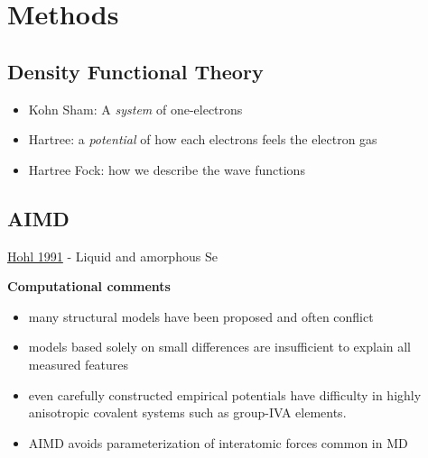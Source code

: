 \documentclass[3p,review,12pt]{elsarticle}
\newcommand{\vs}{\vspace{2mm}}
\begin{document}
\section{Methods}
\subsection{Density Functional Theory}
\begin{itemize}
	\item Kohn Sham: A \emph{system} of one-electrons
	\item Hartree: a \emph{potential} of how each electrons feels the electron gas
	\item Hartree Fock: how we describe the wave functions
\end{itemize}
\subsection{AIMD}
\underline{Hohl 1991}\cite{Hohl1991} - Liquid and amorphous Se \par \vs
\textbf{Computational comments}
\begin{itemize}
	\item many structural models have been proposed and often conflict
	\item models based solely on small differences are insufficient to explain all measured features
	\item even carefully constructed empirical potentials have difficulty in highly anisotropic covalent systems such as group-IVA elements.
	\item AIMD avoids parameterization of interatomic forces common in MD
\end{itemize}
\end{document}
